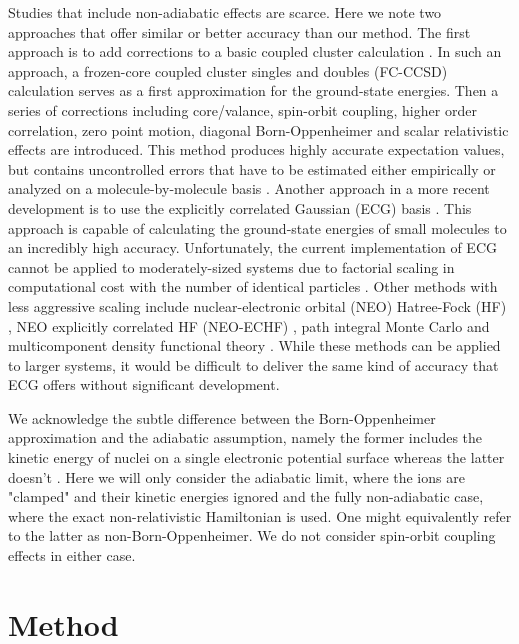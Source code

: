 \documentclass[aps,prl,superscriptaddress,groupedaddress]{revtex4}
\begin{document}
Studies that include non-adiabatic effects are scarce. Here we note two approaches that offer similar or better accuracy than our method. The first approach is to add corrections to a basic coupled cluster calculation \cite{Feller_Corrections}. In such an approach, a frozen-core coupled cluster singles and doubles (FC-CCSD) \cite{Purvis_CCSD} calculation serves as a first approximation for the ground-state energies. Then a series of corrections including core/valance, spin-orbit coupling, higher order correlation, zero point motion, diagonal Born-Oppenheimer and scalar relativistic effects are introduced. This method produces highly accurate expectation values, but contains uncontrolled errors that have to be estimated either empirically or analyzed on a molecule-by-molecule basis \cite{Feller_Error}. Another approach in a more recent development is to use the explicitly correlated Gaussian (ECG) basis \cite{Adamowicz_ECG,Mitroy_ECG}. This approach is capable of calculating the ground-state energies of small molecules to an incredibly high accuracy. Unfortunately, the current implementation of ECG cannot be applied to moderately-sized systems due to factorial scaling in computational cost with the number of identical particles \cite{Bubin_BH_noBO}. Other methods with less aggressive scaling include nuclear-electronic orbital (NEO) Hatree-Fock (HF) \cite{Sharon_NEO}, NEO explicitly correlated HF (NEO-ECHF) \cite{Sharon_NEOX,Sharon_NEOX1,Sharon_NEOX2}, path integral Monte Carlo \cite{Ilkka_Path,Ilkka_Path1,Ilkka_Path2} and multicomponent density functional theory \cite{Sharon_NEO-DFT,Sharon_NEO-DFT1,Sharon_NEO-DFT2,Sharon_NEO-DFT3,Gross_NEO-DFT,Gross_NEO-DFT1}. While these methods can be applied to larger systems, it would be difficult to deliver the same kind of accuracy that ECG offers without significant development.

We acknowledge the subtle difference between the Born-Oppenheimer approximation and the adiabatic assumption, namely the former includes the kinetic energy of nuclei on a single electronic potential surface whereas the latter doesn't \cite{Cederbaum_BO}. Here we will only consider the adiabatic limit, where the ions are "clamped" and their kinetic energies ignored and the fully non-adiabatic case, where the exact non-relativistic Hamiltonian is used. One might equivalently refer to the latter as non-Born-Oppenheimer. We do not consider spin-orbit coupling effects in either case.

\section{Method}
\end{document}
